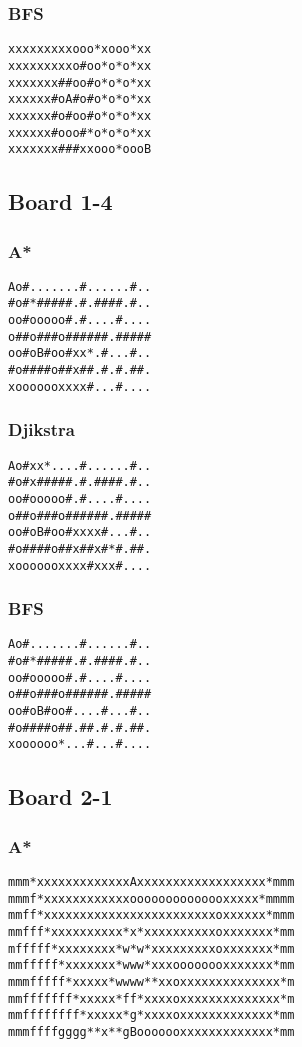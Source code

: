 \documentclass[11pt,a4paper]{article}
\begin{document}
\subsubsection*{BFS}
\begin{lstlisting}
xxxxxxxxxooo*xooo*xx
xxxxxxxxxo#oo*o*o*xx
xxxxxxx##oo#o*o*o*xx
xxxxxx#oA#o#o*o*o*xx
xxxxxx#o#oo#o*o*o*xx
xxxxxx#ooo#*o*o*o*xx
xxxxxxx###xxooo*oooB
\end{lstlisting}

\subsection*{Board 1-4}
\subsubsection*{A*}
\begin{lstlisting}
Ao#.......#......#..
#o#*#####.#.####.#..
oo#ooooo#.#....#....
o##o###o######.#####
oo#oB#oo#xx*.#...#..
#o####o##x##.#.#.##.
xooooooxxxx#...#....
\end{lstlisting}

\subsubsection*{Djikstra}
\begin{lstlisting}
Ao#xx*....#......#..
#o#x#####.#.####.#..
oo#ooooo#.#....#....
o##o###o######.#####
oo#oB#oo#xxxx#...#..
#o####o##x##x#*#.##.
xooooooxxxx#xxx#....
\end{lstlisting}

\subsubsection*{BFS}
\begin{lstlisting}
Ao#.......#......#..
#o#*#####.#.####.#..
oo#ooooo#.#....#....
o##o###o######.#####
oo#oB#oo#....#...#..
#o####o##.##.#.#.##.
xoooooo*...#...#....
\end{lstlisting}

\subsection*{Board 2-1}
\subsubsection*{A*}
\begin{lstlisting}
mmm*xxxxxxxxxxxxxAxxxxxxxxxxxxxxxxxx*mmm
mmmf*xxxxxxxxxxxxoooooooooooooxxxxx*mmmm
mmff*xxxxxxxxxxxxxxxxxxxxxxxxoxxxxxx*mmm
mmfff*xxxxxxxxxx*x*xxxxxxxxxxoxxxxxxx*mm
mfffff*xxxxxxxx*w*w*xxxxxxxxxoxxxxxxx*mm
mmfffff*xxxxxxx*www*xxxoooooooxxxxxxx*mm
mmmfffff*xxxxx*wwww**xxoxxxxxxxxxxxxxx*m
mmfffffff*xxxxx*ff*xxxxoxxxxxxxxxxxxxx*m
mmffffffff*xxxxx*g*xxxxoxxxxxxxxxxxxx*mm
mmmffffgggg**x**gBooooooxxxxxxxxxxxxx*mm
\end{lstlisting}
\end{document}
